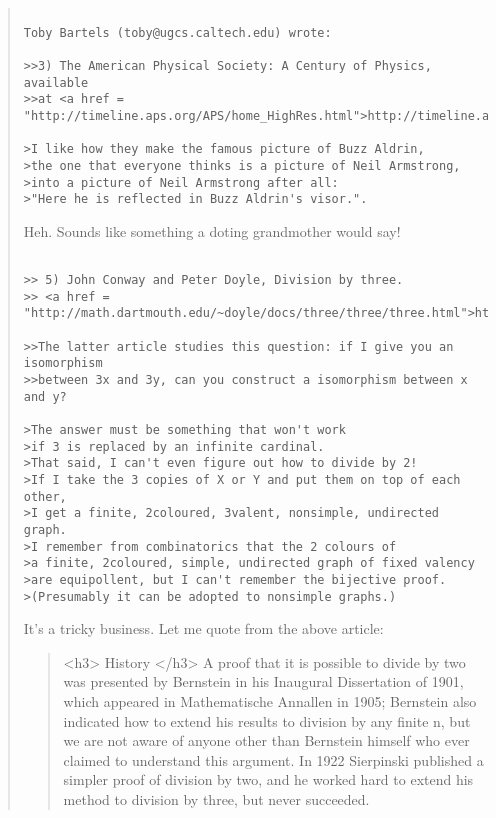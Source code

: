 \begin{quote}

\begin{verbatim}

Toby Bartels (toby@ugcs.caltech.edu) wrote:

>>3) The American Physical Society: A Century of Physics, available
>>at <a href = "http://timeline.aps.org/APS/home_HighRes.html">http://timeline.aps.org/APS/home_HighRes.html</a>

>I like how they make the famous picture of Buzz Aldrin,
>the one that everyone thinks is a picture of Neil Armstrong,
>into a picture of Neil Armstrong after all:
>"Here he is reflected in Buzz Aldrin's visor.".
\end{verbatim}
    

Heh.  Sounds like something a doting grandmother would say!


\begin{verbatim}

>> 5) John Conway and Peter Doyle, Division by three.  
>> <a href = "http://math.dartmouth.edu/~doyle/docs/three/three/three.html">http://math.dartmouth.edu/~doyle/docs/three/three/three.html</a>

>>The latter article studies this question: if I give you an isomorphism 
>>between 3x and 3y, can you construct a isomorphism between x and y?  

>The answer must be something that won't work
>if 3 is replaced by an infinite cardinal.
>That said, I can't even figure out how to divide by 2!
>If I take the 3 copies of X or Y and put them on top of each other,
>I get a finite, 2coloured, 3valent, nonsimple, undirected graph.
>I remember from combinatorics that the 2 colours of
>a finite, 2coloured, simple, undirected graph of fixed valency
>are equipollent, but I can't remember the bijective proof.
>(Presumably it can be adopted to nonsimple graphs.)
\end{verbatim}
    

It's a tricky business.  Let me quote from the above article:

\begin{quote}
<h3> History </h3>
A proof that it is possible to divide by two was presented by Bernstein in
his Inaugural Dissertation of 1901, which appeared in Mathematische Annallen
in 1905; Bernstein also indicated how to extend his results to division
by any finite n, but we are not aware of anyone other than Bernstein himself
who ever claimed to understand this argument. In 1922 Sierpinski 
published a simpler proof of division by two, and he worked hard to extend
his method to division by three, but never succeeded.


\end{quote}
\end{quote}
